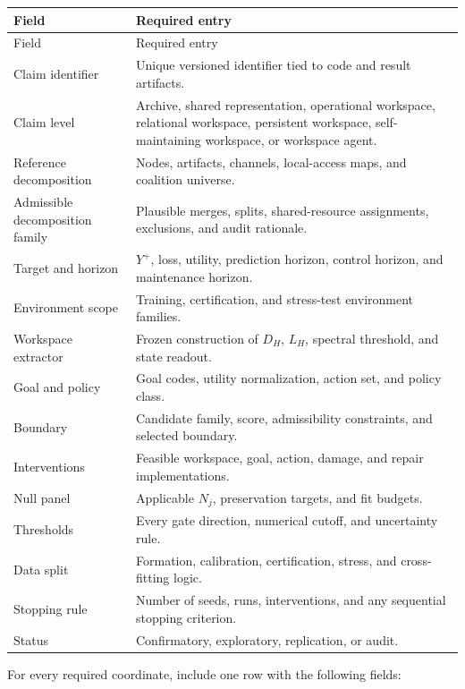 \begin{longtable}{@{}>{\raggedright\arraybackslash}p{}>{\raggedright\arraybackslash}p{}@{}}
\toprule
Field & Required entry \\
\midrule
\endfirsthead
\toprule
Field & Required entry \\
\midrule
\endhead
Claim identifier & Unique versioned identifier tied to code and result
artifacts. \\
Claim level & Archive, shared representation, operational workspace,
relational workspace, persistent workspace, self-maintaining workspace, or
workspace agent. \\
Reference decomposition & Nodes, artifacts, channels, local-access maps, and coalition universe. \\
Admissible decomposition family & Plausible merges, splits, shared-resource assignments, exclusions, and audit rationale. \\
Target and horizon & \(Y^+\), loss, utility, prediction horizon, control
horizon, and maintenance horizon. \\
Environment scope & Training, certification, and stress-test environment
families. \\
Workspace extractor & Frozen construction of \(D_H\), \(L_H\), spectral
threshold, and state readout. \\
Goal and policy & Goal codes, utility normalization, action set, and policy
class. \\
Boundary & Candidate family, score, admissibility constraints, and selected
boundary. \\
Interventions & Feasible workspace, goal, action, damage, and repair
implementations. \\
Null panel & Applicable \(N_j\), preservation targets, and fit budgets. \\
Thresholds & Every gate direction, numerical cutoff, and uncertainty rule. \\
Data split & Formation, calibration, certification, stress, and cross-fitting
logic. \\
Stopping rule & Number of seeds, runs, interventions, and any sequential
stopping criterion. \\
Status & Confirmatory, exploratory, replication, or audit. \\
\bottomrule
\end{longtable}


For every required coordinate, include one row with the following fields:

